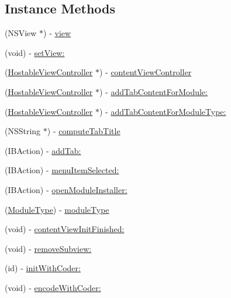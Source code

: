 \subsection*{Instance Methods}
\begin{DoxyCompactItemize}
\item 
(N\-S\-View $\ast$) -\/ \hyperlink{interface_workspace_view_host_controller_ac426656af30e3d0dc3b904ebcd81c38f}{view}
\item 
(void) -\/ \hyperlink{interface_workspace_view_host_controller_a9544a8dd4794dc764c2d74870c87ae35}{set\-View\-:}
\item 
(\hyperlink{interface_hostable_view_controller}{Hostable\-View\-Controller} $\ast$) -\/ \hyperlink{interface_workspace_view_host_controller_a9a35c8e1bb28fe1712da8dd47b68d0d1}{content\-View\-Controller}
\item 
(\hyperlink{interface_hostable_view_controller}{Hostable\-View\-Controller} $\ast$) -\/ \hyperlink{interface_workspace_view_host_controller_abf3b4d5789032956cbe75faf6ba8070e}{add\-Tab\-Content\-For\-Module\-:}
\item 
(\hyperlink{interface_hostable_view_controller}{Hostable\-View\-Controller} $\ast$) -\/ \hyperlink{interface_workspace_view_host_controller_ae835590118c97dab34cc0b8972981693}{add\-Tab\-Content\-For\-Module\-Type\-:}
\item 
(N\-S\-String $\ast$) -\/ \hyperlink{interface_workspace_view_host_controller_a3b2367b9037c8406f576bea4e2c6a57a}{compute\-Tab\-Title}
\item 
(I\-B\-Action) -\/ \hyperlink{interface_workspace_view_host_controller_a23f667ef7e2a716f187f106b39dfac49}{add\-Tab\-:}
\item 
(I\-B\-Action) -\/ \hyperlink{interface_workspace_view_host_controller_a761643b5840601b89353b352084ef165}{menu\-Item\-Selected\-:}
\item 
(I\-B\-Action) -\/ \hyperlink{interface_workspace_view_host_controller_aa3b937b750d09e1fbcf57a3c2aa11d8f}{open\-Module\-Installer\-:}
\item 
(\hyperlink{_sword_module_8h_a224128d35337e2b42cebf846d4d0c6f1}{Module\-Type}) -\/ \hyperlink{interface_workspace_view_host_controller_a2e69825435ec5d0c8cd8c49f5655ab6c}{module\-Type}
\item 
(void) -\/ \hyperlink{interface_workspace_view_host_controller_a14ea82a054bc45c1a1c62bb7f6985da2}{content\-View\-Init\-Finished\-:}
\item 
(void) -\/ \hyperlink{interface_workspace_view_host_controller_afc97bbb7e9b0d2f6b9fd995ada16f4a1}{remove\-Subview\-:}
\item 
(id) -\/ \hyperlink{interface_workspace_view_host_controller_a6cf57c30ef62d8a0b74eafd74d0f8b39}{init\-With\-Coder\-:}
\item 
(void) -\/ \hyperlink{interface_workspace_view_host_controller_a958c5e82e2f22a1a132161999b5d1704}{encode\-With\-Coder\-:}
\end{DoxyCompactItemize}
